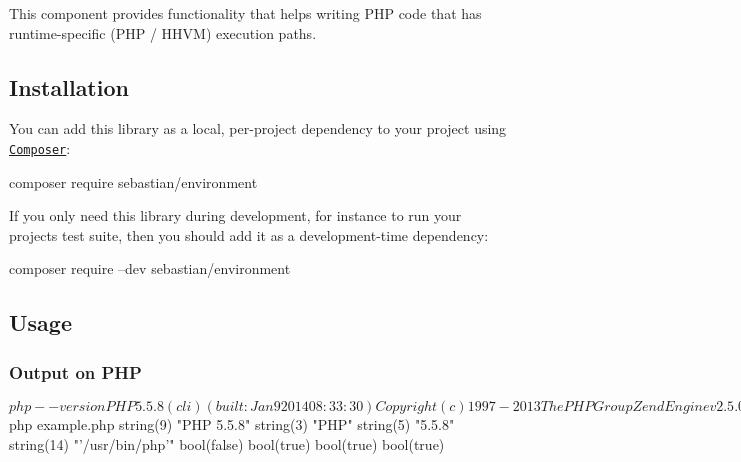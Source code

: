 This component provides functionality that helps writing P\+HP code that has runtime-\/specific (P\+HP / H\+H\+VM) execution paths.

\href{https://packagist.org/packages/sebastian/environment}{\tt } \href{https://travis-ci.org/sebastianbergmann/environment}{\tt }

\subsection*{Installation}

You can add this library as a local, per-\/project dependency to your project using \href{https://getcomposer.org/}{\tt Composer}\+: \begin{DoxyVerb}composer require sebastian/environment
\end{DoxyVerb}


If you only need this library during development, for instance to run your project\textquotesingle{}s test suite, then you should add it as a development-\/time dependency\+: \begin{DoxyVerb}composer require --dev sebastian/environment
\end{DoxyVerb}


\subsection*{Usage}




\subsubsection*{Output on P\+HP}

\begin{DoxyVerb}$ php --version
PHP 5.5.8 (cli) (built: Jan  9 2014 08:33:30)
Copyright (c) 1997-2013 The PHP Group
Zend Engine v2.5.0, Copyright (c) 1998-2013 Zend Technologies
    with Xdebug v2.2.3, Copyright (c) 2002-2013, by Derick Rethans


$ php example.php
string(9) "PHP 5.5.8"
string(3) "PHP"
string(5) "5.5.8"
string(14) "'/usr/bin/php'"
bool(false)
bool(true)
bool(true)
bool(true)
\end{DoxyVerb}


